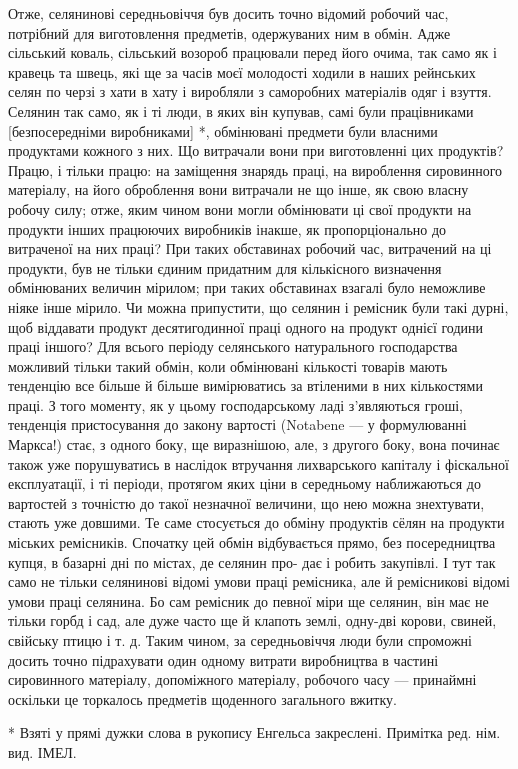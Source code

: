 Отже, селянинові середньовіччя був досить точно відомий робочий час, потрібний для виготовлення предметів, одержуваних ним в
обмін. Адже сільський коваль, сільський возороб працювали перед його очима, так само як і кравець та швець, які ще за часів
моєї молодості ходили в наших рейнських селян по черзі з хати в хату і виробляли з саморобних матеріалів одяг і взуття.
Селянин так само, як і ті люди, в яких він купував, самі були працівниками [безпосередніми виробниками] *, обмінювані
предмети були власними продуктами кожного з них. Що витрачали вони при виготовленні цих продуктів? Працю, і тільки працю: на
заміщення знарядь праці, на вироблення сировинного матеріалу, на його оброблення вони витрачали не що інше, як свою власну
робочу силу; отже, яким чином вони могли обмінювати ці свої продукти на продукти інших працюючих виробників інакше, як
пропорціонально до витраченої на них праці?  При таких обставинах робочий час, витрачений на ці продукти, був не тільки
єдиним придатним для кількісного визначення обмінюваних величин мірилом; при таких обставинах взагалі було неможливе ніяке
інше мірило. Чи можна припустити, що селянин і ремісник були такі дурні, щоб віддавати продукт десятигодинної праці одного
на продукт однієї години праці іншого? Для всього періоду селянського натурального господарства можливий тільки такий
обмін, коли обмінювані кількості товарів мають тенденцію все більше й більше вимірюватись за втіленими в них кількостями
праці. З того моменту, як у цьому господарському ладі з’являються гроші, тенденція пристосування до закону вартості
(Notabene — у формулюванні Маркса!) стає, з одного боку, ще виразнішою, але, з другого боку, вона починає також уже
порушуватись в наслідок втручання лихварського капіталу і фіскальної експлуатації, і ті періоди, протягом яких ціни в
середньому наближаються до вартостей з точністю до такої незначної величини, що нею можна знехтувати, стають уже довшими. Те
саме стосується до обміну продуктів сёлян на продукти міських ремісників. Спочатку цей обмін відбувається прямо, без
посередництва купця, в базарні дні по містах, де селянин про- дає і робить закупівлі. І тут так само не тільки селянинові
відомі умови праці ремісника, але й ремісникові відомі умови праці селянина. Бо сам ремісник до певної міри ще селянин, він
має не тільки горбд і сад, але дуже часто ще й клапоть землі, одну-дві корови, свиней, свійську птицю і т. д. Таким чином,
за середньовіччя люди були спроможні досить точно підрахувати один одному витрати виробництва в частині сировинного
матеріалу, допоміжного матеріалу, робочого часу — принаймні оскільки це торкалось предметів щоденного загального вжитку.

* Взяті у прямі дужки слова в рукопису Енгельса закреслені. Примітка ред. нім. вид. ІМЕЛ.
